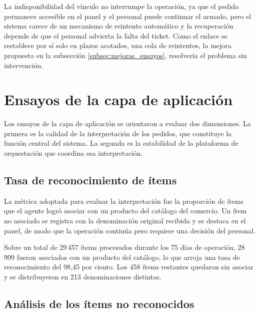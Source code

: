 La indisponibilidad del vínculo no interrumpe la operación, ya que el pedido permanece accesible en el panel y el personal puede continuar el armado, pero el sistema carece de un mecanismo de reintento automático y la recuperación depende de que el personal advierta la falta del ticket. Como el enlace se restablece por sí solo en plazos acotados, una cola de reintentos, la mejora propuesta en la subsección \ref{subsec:mejoras_ensayos}, resolvería el problema sin intervención.


\section{Ensayos de la capa de aplicación}
\label{sec:ensayos_aplicacion}

Los ensayos de la capa de aplicación se orientaron a evaluar dos dimensiones. La primera es la calidad de la interpretación de los pedidos, que constituye la función central del sistema. La segunda es la estabilidad de la plataforma de orquestación que coordina esa interpretación.

\subsection{Tasa de reconocimiento de ítems}
\label{subsec:tasa_reconocimiento}

La métrica adoptada para evaluar la interpretación fue la proporción de ítems que el agente logró asociar con un producto del catálogo del comercio. Un ítem no asociado se registra con la denominación original recibida y se destaca en el panel, de modo que la operación continúa pero requiere una decisión del personal.

Sobre un total de 29\,457 ítems procesados durante los 75 días de operación, 28\,999 fueron asociados con un producto del catálogo, lo que arroja una tasa de reconocimiento del 98,45 por ciento. Los 458 ítems restantes quedaron sin asociar y se distribuyeron en 213 denominaciones distintas.

\subsection{Análisis de los ítems no reconocidos}
\label{subsec:items_no_reconocidos}


